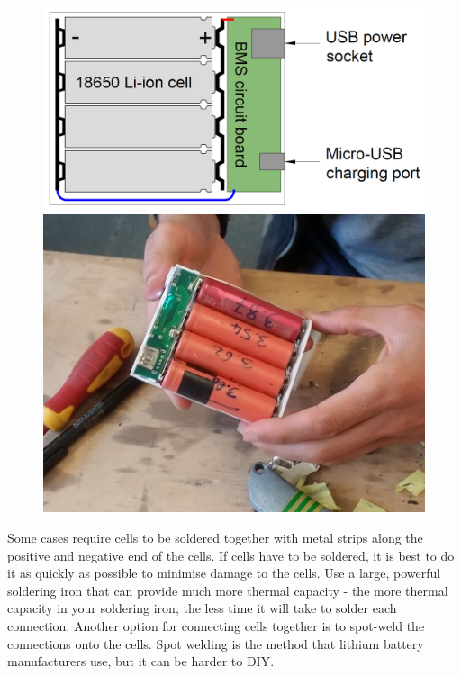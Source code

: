 \documentclass{article}
\theoremstyle{definition}
\theoremstyle{definition}
\theoremstyle{remark}
\begin{document}
  \begin{figure}[!ht]
    \centering
    \includegraphics[width=0.35\paperwidth]{Images/image_6_1_(power_bank_diagram).png}
    \includegraphics[width=0.30\paperwidth]{Images/image_6_2_(power_bank).png}
  \end{figure}

  Some cases require cells to be soldered together with metal strips along the positive and negative end of the cells. If cells have to be soldered, it is best to do it as quickly as possible to minimise damage to the cells. Use a large, powerful soldering iron that can provide much more thermal capacity - the more thermal capacity in your soldering iron, the less time it will take to solder each connection. Another option for connecting cells together is to spot-weld the connections onto the cells. Spot welding is the method that lithium battery manufacturers use, but it can be harder to DIY. 
\end{document}
